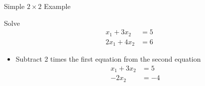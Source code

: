 \documentclass[10pt]{beamer}
\begin{document}

\begin{frame}{Simple $2\times2$ Example}

\begin{example}
Solve
\begin{align*}
      x_1 + 3x_2 &= 5\\
    2 x_1 + 4x_2 &= 6
\end{align*}
\end{example}
\begin{itemize}
    \item Subtract 2 times the first equation from the second equation
\begin{align*}
      x_1 + 3x_2 &= 5\\
          - 2x_2 &= -4
\end{align*}

\end{itemize}
 \end{frame}
\end{document}
